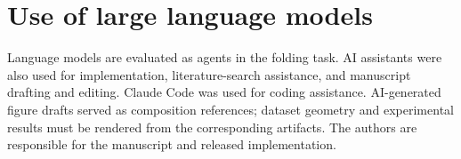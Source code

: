 \section*{Use of large language models}
\label{sec:llm-use}

Language models are evaluated as agents in the folding task. AI assistants were also used for
implementation, literature-search assistance, and manuscript drafting and editing. Claude Code
was used for coding assistance. AI-generated figure drafts served as composition references;
dataset geometry and experimental results must be rendered from the corresponding artifacts.
The authors are responsible for the manuscript and released implementation.

